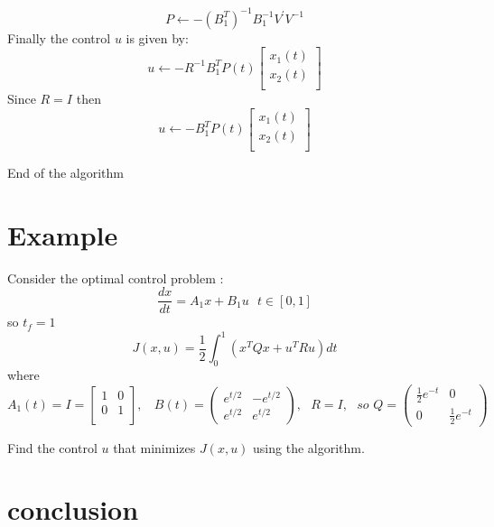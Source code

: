 \documentclass[12pt]{article}
\begin{document}
 $$ P\leftarrow  -(B_1^T)^{-1}B_1^{-1}V^{'}V^{-1}$$
 Finally the control $u$ is given by:
 $$u\leftarrow-R^{-1}B_1^TP(t)\begin{bmatrix}
     x_1(t)\\
     x_2(t)\\
 \end{bmatrix}$$
 Since $R=I$
 then
 $$u\leftarrow-B_1^TP(t)\begin{bmatrix}
     x_1(t)\\
     x_2(t)\\
 \end{bmatrix}$$

\large{End of the algorithm}
\section{Example}

Consider the optimal control problem :
$$\frac{dx}{dt}=A_1x+B_1u   \ \ \ t\in[0, 1] $$
so $t_f=1$
$$J(x,u)=\frac{1}{2}\int_0^1 (x^TQx+u^TRu)dt$$
    where $$ A_1(t)=I=\begin{bmatrix}
        1&0\\
        0&1\\
    \end{bmatrix},   \ \ \ \  B(t)=\left (\begin{array}{cc}e^{t/2}&
-e^{t/2}\\
e^{t/2}&e^{t/2}\end{array}\right ), \ \ \ R=I ,\ \ \ so \, \,
Q=\left(\begin{array}{cc}\frac{1}{2}e^{-t}&0\\
0&\frac{1}{2}e^{-t}\end{array}\right ) $$

Find the control $u$ that minimizes $J(x,u)$
using the algorithm.\\ 


\section{conclusion}
\end{document}
